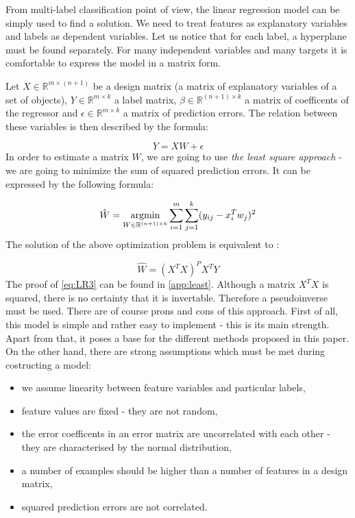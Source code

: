 From multi-label classification point of view, the linear regression model can be simply used to find a solution. We need to treat features as explanatory variables and labels as dependent variables. Let us notice that for each label, a hyperplane must be found separately. For many independent variables and many targets it is comfortable to express the model in a matrix form.  

Let $X \in \mathbb{R}^{m \times  ( n+1 )}$ be a design matrix (a matrix of explanatory variables of a set of objects), $Y \in \mathbb{R}^{m \times k}$ a label matrix, $\beta \in \mathbb{R}^{(n+1) \times k}$ a matrix of coefficents of the regressor and $\epsilon \in \mathbb{R}^{m \times k}$ a matrix of prediction errors. The relation between these variables is then described by the formula:

\begin{equation}\label{eq:LR1}
    Y = XW + \epsilon 
\end{equation}
In order to estimate a matrix $W$, we are going to use \textit{the least square approach} - we are going to minimize the sum of squared prediction errors. It can be expressed by the following formula:

\begin{equation}\label{eq:LR2}
    \hat{W} = \operatorname*{argmin}_{W \in \mathbb{R}^{(n+1) \times k}}\sum\limits_{i=1}^{m}\sum\limits_{j=1}^{k}(y_{ij}-x^T_iw_j)^2
\end{equation}
The solution of the above optimization problem is equivalent to \cite{Weisberg}:

\begin{equation}\label{eq:LR3}
    \hat{W} = (X^TX)^{P}X^TY
\end{equation}
The proof of \cref{eq:LR3} can be found in \cref{app:least}. Although a matrix $X^TX$ is squared, there is no certainty that it is invertable. Therefore a pseudoinverse must be used. There are of course prons and cons of this approach. First of all, this model is simple and rather easy to implement - this is its main strength. Apart from that, it poses a base for the different methods proposed in this paper. On the other hand, there are strong assumptions which must be met during costructing a model:

\begin{itemize}
    \item we assume linearity between feature variables and particular labels,
    \item feature values are fixed - they are not random,
    \item the error coefficents in an error matrix are uncorrelated with each other - they are characterised by the normal distribution,
    \item a number of examples should be higher than a number of features in a design matrix,
    \item squared prediction errors are not correlated.
\end{itemize}

